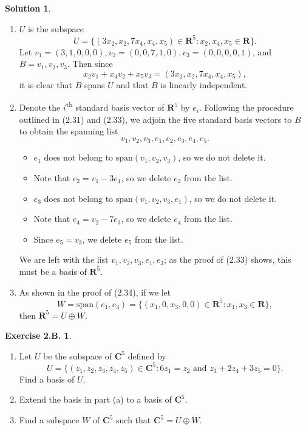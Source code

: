 \documentclass[12pt]{article}
\theoremstyle{definition}
\theoremstyle{exercise}
\newtheorem{exercise}{Exercise 2.B.}
\theoremstyle{solution}
\newtheorem*{solution}{Solution}
\newcommand{\ts}{\textsuperscript}
\newcommand{\Span}{\text{span}}
\newcommand{\R}{\mathbf{R}}
\newcommand{\C}{\mathbf{C}}
\begin{document}
\begin{solution}
    \begin{enumerate}
        \item \( U \) is the subspace
        \[
            U = \{ (3 x_2, x_2, 7 x_4, x_4, x_5) \in \R^5 : x_2, x_4, x_5 \in \R \}.
        \]
        Let \( v_1 = (3, 1, 0, 0, 0), v_2 = (0, 0, 7, 1, 0), v_3 = (0, 0, 0, 0, 1) \), and \( B = v_1, v_2, v_3 \). Then since
        \[
            x_2 v_1 + x_4 v_2 + x_5 v_3 = (3 x_2, x_2, 7 x_4, x_4, x_5),
        \]
        it is clear that \( B \) spans \( U \) and that \( B \) is linearly independent.

        \item Denote the \( i \)\ts{th} standard basis vector of \( \R^5 \) by \( e_i \). Following the procedure outlined in (2.31) and (2.33), we adjoin the five standard basis vectors to \( B \) to obtain the spanning list
        \[
            v_1, v_2, v_3, e_1, e_2, e_3, e_4, e_5.
        \]
        \begin{itemize}
            \item \( e_1 \) does not belong to \( \Span(v_1, v_2, v_3) \), so we do not delete it.

            \item Note that \( e_2 = v_1 - 3 e_1 \), so we delete \( e_2 \) from the list.

            \item \( e_3 \) does not belong to \( \Span(v_1, v_2, v_3, e_1) \), so we do not delete it.

            \item Note that \( e_4 = v_2 - 7 e_3 \), so we delete \( e_4 \) from the list.

            \item Since \( e_5 = v_3 \), we delete \( e_5 \) from the list.
        \end{itemize}
        We are left with the list \( v_1, v_2, v_3, e_1, e_3 \); as the proof of (2.33) shows, this must be a basis of \( \R^5 \).

        \item As shown in the proof of (2.34), if we let
        \[
            W = \Span (e_1, e_3) = \{ (x_1, 0, x_3, 0, 0) \in \R^5 : x_1, x_3 \in \R \},
        \]
        then \( \R^5 = U \oplus W \).
    \end{enumerate}
\end{solution}

\begin{exercise}
\label{ex:4}
    \begin{enumerate}
        \item Let \( U \) be the subspace of \( \C^5 \) defined by
        \[
            U = \{ (z_1, z_2, z_3, z_4, z_5) \in \C^5 : 6 z_1 = z_2 \text{ and } z_3 + 2 z_4 + 3 z_5 = 0 \}.
        \]
        Find a basis of \( U \).

        \item Extend the basis in part (a) to a basis of \( \C^5 \).

        \item Find a subspace \( W \) of \( \C^5 \) such that \( \C^5 = U \oplus W \).
    \end{enumerate}
\end{exercise}
\end{document}
